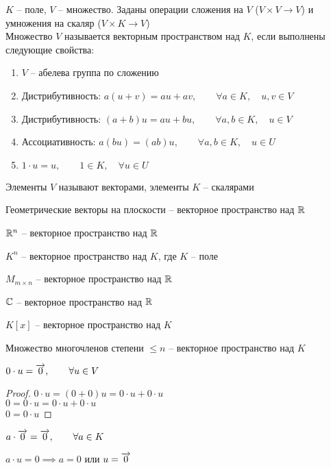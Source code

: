\begin{definition}
	$K$ -- поле, $V$ -- множество. Заданы операции сложения на $V$ ($V \times V \to V$) и умножения на скаляр ($V \times K \to V$) \\
    Множество $V$ называется векторным пространством над $K$, если выполнены следующие свойства:
    \begin{enumerate}
    	\item $V$ -- абелева группа по сложению
        \item Дистрибутивность: $ a(u + v) = au + av, \qquad \forall a \in K, \quad u, v \in V $
        \item Дистрибутивность: $ (a + b)u = au + bu, \qquad \forall a, b \in K, \quad u \in V $
        \item Ассоциативность: $ a(bu) = (ab)u, \qquad \forall a, b \in K, \quad u \in U $
        \item $ 1 \cdot u = u, \qquad 1 \in K, \quad \forall u \in U $
    \end{enumerate}
    Элементы $V$ называют векторами, элементы $K$ -- скалярами
\end{definition}

\begin{exmpls}
	\item Геометрические векторы на плоскости -- векторное пространство над $\mathbb{R}$
    \item $\mathbb{R}^n$ -- векторное пространство над $\mathbb{R}$
    \item $K^n$ -- векторное пространство над $K$, где $K$ -- поле
    \item $M_{m \times n}$ -- векторное пространство над $\mathbb{R}$
    \item $\mathbb{C}$ -- векторное пространство над $\mathbb{R}$
    \item $K[x]$ -- векторное пространство над $K$
    \item Множество многочленов степени $\bm\le n$ -- векторное пространство над $K$
\end{exmpls}

\begin{props}
    \item $ 0 \cdot u = \overrightarrow{0}, \qquad \forall u \in V $
    \begin{proof}
    	$ 0 \cdot u = (0 + 0)u = 0 \cdot u + 0 \cdot u $ \\
        $ 0 = 0 \cdot u = 0 \cdot u + 0 \cdot u $ \\
        $ 0 = 0 \cdot u $
    \end{proof}
    \item $ a \cdot \overrightarrow{0} = \overrightarrow{0}, \qquad \forall a \in K $
    \item $a \cdot u = 0 \implies a = 0 $ или $ u = \overrightarrow{0} $
\end{props}


